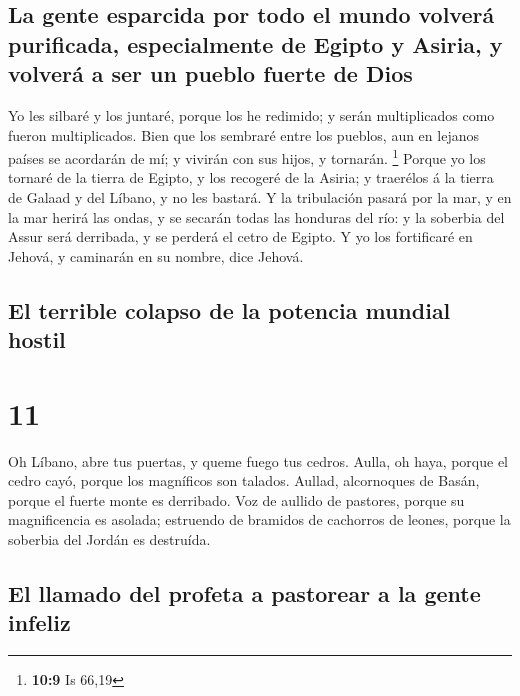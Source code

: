 \hypertarget{la-gente-esparcida-por-todo-el-mundo-volveruxe1-purificada-especialmente-de-egipto-y-asiria-y-volveruxe1-a-ser-un-pueblo-fuerte-de-dios}{%
\subsection{La gente esparcida por todo el mundo volverá purificada,
especialmente de Egipto y Asiria, y volverá a ser un pueblo fuerte de
Dios}\label{la-gente-esparcida-por-todo-el-mundo-volveruxe1-purificada-especialmente-de-egipto-y-asiria-y-volveruxe1-a-ser-un-pueblo-fuerte-de-dios}}

 Yo les silbaré y los juntaré, porque los he redimido; y
serán multiplicados como fueron multiplicados.  Bien que
los sembraré entre los pueblos, aun en lejanos países se acordarán de
mí; y vivirán con sus hijos, y tornarán. \footnote{\textbf{10:9} Is
  66,19}  Porque yo los tornaré de la tierra de Egipto, y
los recogeré de la Asiria; y traerélos á la tierra de Galaad y del
Líbano, y no les bastará.  Y la tribulación pasará por la
mar, y en la mar herirá las ondas, y se secarán todas las honduras del
río: y la soberbia del Assur será derribada, y se perderá el cetro de
Egipto.  Y yo los fortificaré en Jehová, y caminarán en
su nombre, dice Jehová.

\hypertarget{el-terrible-colapso-de-la-potencia-mundial-hostil}{%
\subsection{El terrible colapso de la potencia mundial
hostil}\label{el-terrible-colapso-de-la-potencia-mundial-hostil}}

\hypertarget{section-10}{%
\section{11}\label{section-10}}

 Oh Líbano, abre tus puertas, y queme fuego tus cedros.
 Aulla, oh haya, porque el cedro cayó, porque los
magníficos son talados. Aullad, alcornoques de Basán, porque el fuerte
monte es derribado.  Voz de aullido de pastores, porque su
magnificencia es asolada; estruendo de bramidos de cachorros de leones,
porque la soberbia del Jordán es destruída.

\hypertarget{el-llamado-del-profeta-a-pastorear-a-la-gente-infeliz}{%
\subsection{El llamado del profeta a pastorear a la gente
infeliz}\label{el-llamado-del-profeta-a-pastorear-a-la-gente-infeliz}}

